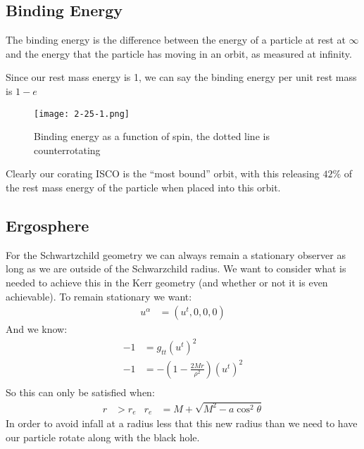 \subsection{Binding Energy}
The binding energy is the difference between the energy of a particle at rest at $\infty$ and the energy that the particle has moving in an orbit, as measured at infinity.

Since our rest mass energy is 1, we can say the binding energy per unit rest mass is $1-e$
\begin{figure*}[h]
	\centering
	\texttt{[image: 2-25-1.png]}
	\caption*{Binding energy as a function of spin, the dotted line is counterrotating}
\end{figure*}
Clearly our corating ISCO is the ``most bound'' orbit, with this releasing $42\%$ of the rest mass energy of the particle when placed into this orbit.
\subsection{Ergosphere}
For the Schwartzchild geometry we can always remain a stationary observer as long as we are outside of the Schwarzchild radius. We want to consider what is needed to achieve this in the Kerr geometry (and whether or not it is even achievable).
To remain stationary we want:
\begin{align*}
	u^\alpha &= (u^t,0,0,0)
\end{align*}
And we know:
\begin{align*}
	-1 &= g_{tt} (u^t)^2 \\
	-1 &= -\left(1- \frac{2Mr}{\rho^2}\right) (u^t)^2 \\
\end{align*}
So this can only be satisfied when:
\begin{align*}
	r &> r_e & r_e &= M + \sqrt{M^2 - a\cos^2\theta}
\end{align*}
In order to avoid infall at a radius less that this new radius than we need to have our particle rotate along with the black hole.
